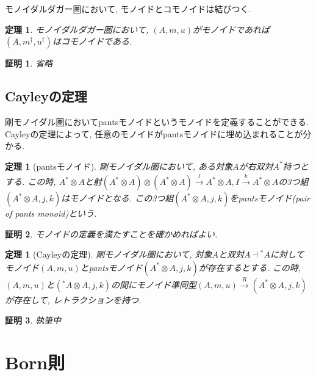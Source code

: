 \documentclass[a4paper,12pt]{ltjsarticle}
\theoremstyle{break}
\newtheorem{defn}[thm]{定義}
\newtheorem{thrm}[thm]{定理}
\newtheorem{eg}[thm]{例}
\newtheorem*{prf}{証明}
\newcommand{\xr}[1]{\xrightarrow{#1}}
\newcommand{\da}{\dagger}
\newcommand{\dav}{\dashv}
\newcommand{\ot}{\otimes}
\numberwithin{equation}{section}
\begin{document}
モノイダルダガー圏において, モノイドとコモノイドは結びつく. 

\begin{thrm}
  モノイダルダガー圏において, $(A,m,u)$がモノイドであれば$(A,m^\da,u^\da)$はコモノイドである. 
\end{thrm}

\begin{prf}
  省略
\end{prf}


\subsection{Cayleyの定理}

剛モノイダル圏においてpantsモノイドというモノイドを定義することができる. 
Cayleyの定理によって, 任意のモノイドがpantsモノイドに埋め込まれることが分かる. 


\begin{thrm}[pantsモノイド]
  剛モノイダル圏において, ある対象$A$が右双対$A^*$持つとする. 
  この時, $A^* \ot A$と射$(A^* \ot A) \ot (A^* \ot A) \xr{j} A^* \ot A, I \xr{k} A^* \ot A$の3つ組$(A^* \ot A,j,k)$はモノイドとなる. 
  この3つ組$(A^* \ot A,j,k)$をpantsモノイド(pair of pants monoid)という. 
\end{thrm}

\begin{prf}
  モノイドの定義を満たすことを確かめればよい. 
\end{prf}

\begin{thrm}[Cayleyの定理]
  剛モノイダル圏において, 対象$A$と双対$A \dav {}^*A$に対してモノイド$(A,m,u)$とpantsモノイド$(A^* \ot A,j,k)$が存在するとする. 
  この時, $(A,m,u)$と$({}^*A \ot A,j,k)$の間にモノイド準同型$(A,m,u) \xr{R} (A^* \ot A,j,k)$が存在して, レトラクションを持つ. 
\end{thrm}

\begin{prf}
  執筆中
\end{prf}

\newpage

\section{Born則}
\end{document}
